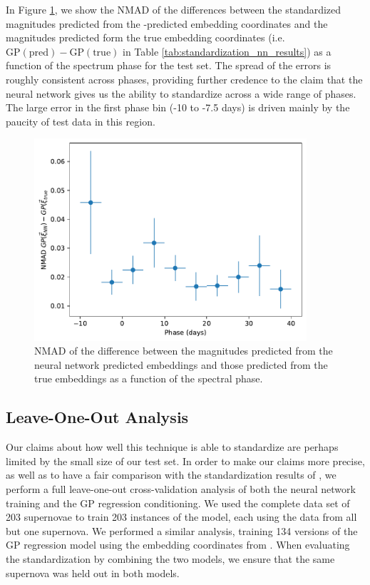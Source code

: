 In Figure \ref{fig:stand_err_vs_phase}, we show the NMAD of the differences between the standardized magnitudes predicted from the  \stoe-predicted embedding coordinates and the magnitudes predicted form the true embedding coordinates (i.e. $\textrm{GP}(\textrm{pred}) - \textrm{GP}(\textrm{true})$ in Table \ref{tab:standardization_nn_results}) as a function of the spectrum phase for the test set. The spread of the errors is roughly consistent across phases, providing further credence to the claim that the neural network gives us the ability to standardize across a wide range of phases. The large error in the first phase bin (-10 to -7.5 days) is driven mainly by the paucity of test data in this region.

\begin{figure}[htbp]
    \centering
    \includegraphics[width=0.9\textwidth]{figures/nn_twins/stand_err_vs_phase_nn.pdf}
    \caption{NMAD of the difference between the magnitudes predicted from the neural network predicted embeddings and those predicted from the true embeddings as a function of the spectral phase.}
    \label{fig:stand_err_vs_phase}
\end{figure}

\subsection{Leave-One-Out Analysis}
Our claims about how well this technique is able to standardize \sne are perhaps limited by the small size of our test set. In order to make our claims more precise, as well as to have a fair comparison with the standardization results of , we perform a full leave-one-out cross-validation analysis of both the neural network training and the GP regression conditioning. We used the complete data set of 203 supernovae to train 203 instances of the \stoe{} model, each using the data from all but one supernova. We performed a similar analysis, training 134 versions of the GP regression model using the embedding coordinates from . When evaluating the standardization by combining the two models, we ensure that the same supernova was held out in both models.

